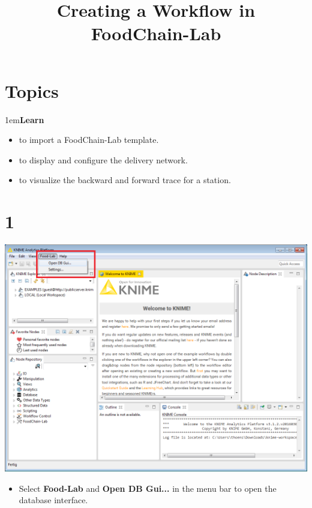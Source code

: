 \documentclass[10pt]{beamer}
\title{Creating a Workflow in FoodChain-Lab}
\date{}
\begin{document}
\maketitle

\section{Topics}
\begin{frame}
\leftskip1em\textbf{Learn}
	\begin{itemize}
      \item to import a FoodChain-Lab template.
      \item to display and configure the delivery network.
      \item to visualize the backward and forward trace for a station.
    \end{itemize}
\end{frame}

\section{1}
\begin{frame}
	\begin{center}
  		\includegraphics[height=0.6\textheight]{1.png}
	\end{center}
	\begin{itemize}
		\item Select \textbf{Food-Lab} and \textbf{Open DB Gui...} in the menu bar to open the database interface.
	\end{itemize}
\end{frame}
\end{document}
